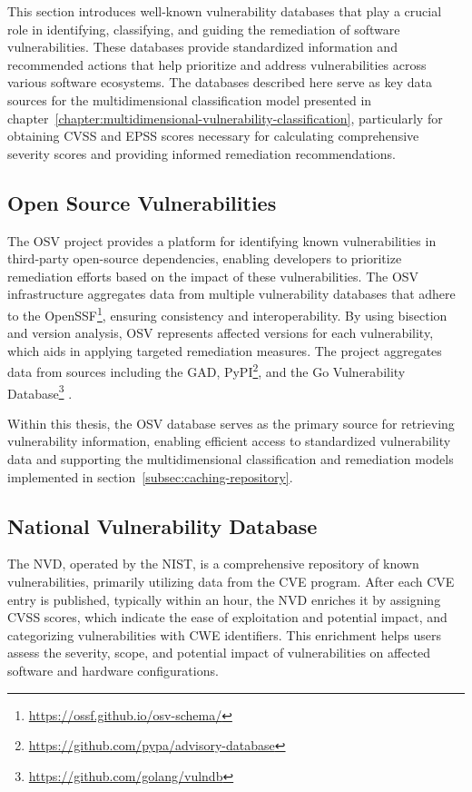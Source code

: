 This section introduces well-known vulnerability databases that play a crucial role in identifying, classifying, and guiding the remediation of software vulnerabilities. These databases provide standardized information and recommended actions that help prioritize and address vulnerabilities across various software ecosystems. The databases described here serve as key data sources for the multidimensional classification model presented in chapter~\ref{chapter:multidimensional-vulnerability-classification}, particularly for obtaining \ac{CVSS} and \ac{EPSS} scores necessary for calculating comprehensive severity scores and providing informed remediation recommendations.

\subsection{Open Source Vulnerabilities}
\label{subsec:open-source-vulnerabilities}

The \ac{OSV} project provides a platform for identifying known vulnerabilities in third-party open-source dependencies, enabling developers to prioritize remediation efforts based on the impact of these vulnerabilities. The \ac{OSV} infrastructure aggregates data from multiple vulnerability databases that adhere to the \ac{OpenSSF}\footnote{\url{https://ossf.github.io/osv-schema/}}, ensuring consistency and interoperability. By using bisection and version analysis, \ac{OSV} represents affected versions for each vulnerability, which aids in applying targeted remediation measures. The project aggregates data from sources including the \ac{GAD}, PyPI\footnote{\url{https://github.com/pypa/advisory-database}}, and the Go Vulnerability Database\footnote{\url{https://github.com/golang/vulndb}} \autocite{osv_introduction_2024}.

Within this thesis, the \ac{OSV} database serves as the primary source for retrieving vulnerability information, enabling efficient access to standardized vulnerability data and supporting the multidimensional classification and remediation models implemented in section~\ref{subsec:caching-repository}.

\subsection{National Vulnerability Database}
\label{subsec:national-vulnerability-database}

The \ac{NVD}, operated by the \ac{NIST}, is a comprehensive repository of known vulnerabilities, primarily utilizing data from the \ac{CVE} program. After each \ac{CVE} entry is published, typically within an hour, the \ac{NVD} enriches it by assigning \ac{CVSS} scores, which indicate the ease of exploitation and potential impact, and categorizing vulnerabilities with \ac{CWE} identifiers. This enrichment helps users assess the severity, scope, and potential impact of vulnerabilities on affected software and hardware configurations.


